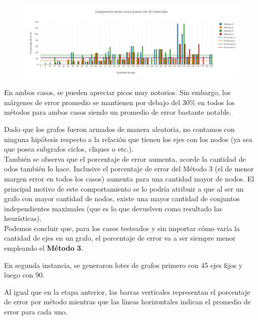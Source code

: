    \begin{figure}[h!]
   \begin{center}
 	\includegraphics[scale=0.55]{imagenes/local/exacto/30nodos.png}
   \end{center}
 \end{figure}

En ambos casos, se pueden apreciar picos muy notorios. Sin embargo, los márgenes de error promedio se mantienen por debajo del 30\% en todos los métodos para ambos casos siendo un promedio de error bastante notable.

Dado que los grafos fueron armados de manera aleatoria, no contamos con ninguna hipótesis respecto a la relación que tienen los ejes con los nodos (ya sea que posea subgrafos ciclos, cliques o etc.).\\

También se observa que el porcentaje de error aumenta, acorde la cantidad de odos también lo hace. Inclusive el porcentaje de error del Método 3 (el de menor margen error en todos los casos) aumenta para una cantidad mayor de nodos. El principal motivo de este comportamiento se lo podría atribuir a que al ser un grafo con mayor cantidad de nodos, existe una mayor cantidad de conjuntos independientes maximales (que es lo que devuelven como resultado las heurísticas).\\

Podemos concluir que, para los casos testeados y sin importar cómo varía la cantidad de ejes en un grafo, el porcentaje de error va a ser siempre menor empleando el \textbf{Método 3}.  

\newpage

En segunda instancia, se generaron lotes de grafos primero con 45 ejes fijos y luego con 90.

Al igual que en la etapa anterior, las barras verticales representan el porcentaje de error por método mientras que las líneas horizontales indican el promedio de error para cada uno.

